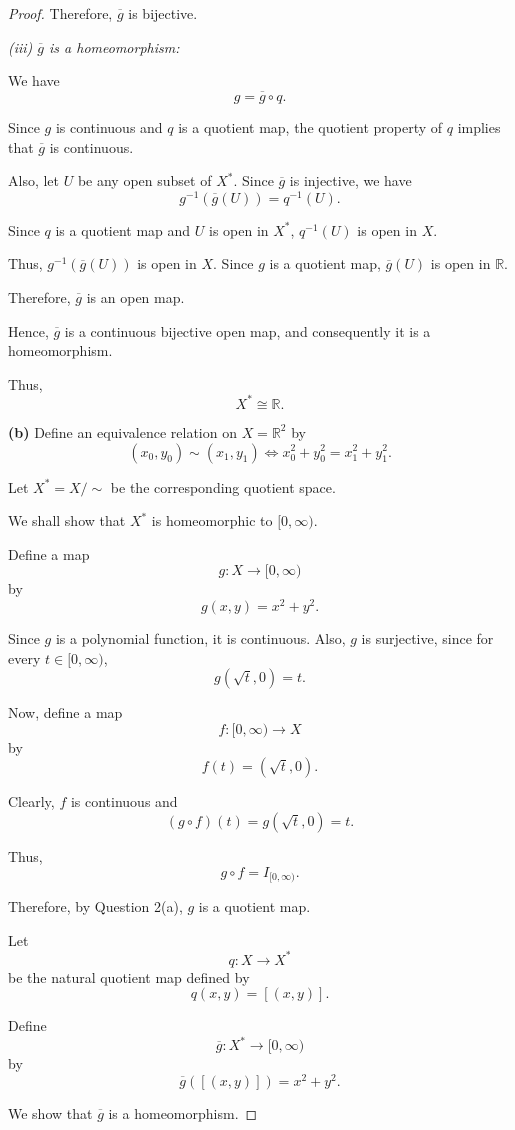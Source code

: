 \begin{proof}
Therefore, \(\overline{g}\) is bijective.

\textit{(iii) \(\overline{g}\) is a homeomorphism:}

We have
\[
g=\overline{g}\circ q.
\]

Since \(g\) is continuous and \(q\) is a quotient map,
the quotient property of \(q\) implies that
\(\overline{g}\) is continuous.

Also, let \(U\) be any open subset of \(X^*\).
Since \(\overline{g}\) is injective, we have
\[
g^{-1}(\overline{g}(U))=q^{-1}(U).
\]

Since \(q\) is a quotient map and \(U\) is open in
\(X^*\), \(q^{-1}(U)\) is open in \(X\).

Thus, \(g^{-1}(\overline{g}(U))\) is open in \(X\).
Since \(g\) is a quotient map, \(\overline{g}(U)\)
is open in \(\mathbb{R}\).

Therefore, \(\overline{g}\) is an open map.

Hence, \(\overline{g}\) is a continuous bijective open
map, and consequently it is a homeomorphism.

Thus,
\[
\boxed{X^*\cong\mathbb{R}.}
\]

\medskip

\textbf{(b)} Define an equivalence relation on
\(X=\mathbb{R}^2\) by
\[
(x_0,y_0)\sim(x_1,y_1)
\iff x_0^2+y_0^2=x_1^2+y_1^2.
\]

Let \(X^*=X/\sim\) be the corresponding quotient space.

We shall show that \(X^*\) is homeomorphic to
\([0,\infty)\).

Define a map
\[
g:X\to[0,\infty)
\]
by
\[
g(x,y)=x^2+y^2.
\]

Since \(g\) is a polynomial function, it is continuous.
Also, \(g\) is surjective, since for every
\(t\in[0,\infty)\),
\[
g(\sqrt{t},0)=t.
\]

Now, define a map
\[
f:[0,\infty)\to X
\]
by
\[
f(t)=(\sqrt{t},0).
\]

Clearly, \(f\) is continuous and
\[
(g\circ f)(t)=g(\sqrt{t},0)=t.
\]

Thus,
\[
g\circ f=I_{[0,\infty)}.
\]

Therefore, by Question 2(a), \(g\) is a quotient map.

Let
\[
q:X\to X^*
\]
be the natural quotient map defined by
\[
q(x,y)=[(x,y)].
\]

Define
\[
\overline{g}:X^*\to[0,\infty)
\]
by
\[
\overline{g}([(x,y)])=x^2+y^2.
\]

We show that \(\overline{g}\) is a homeomorphism.


\end{proof}
